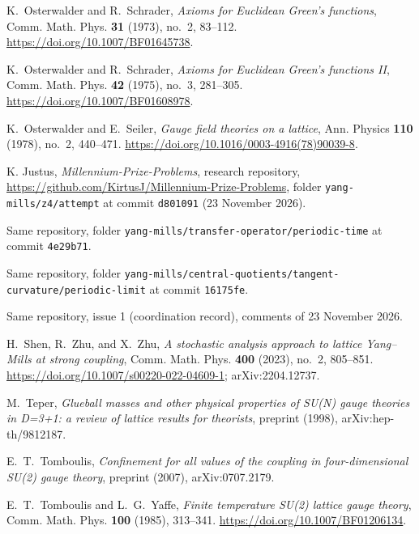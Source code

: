 K.~Osterwalder and R.~Schrader, \emph{Axioms for Euclidean Green's functions},
Comm. Math. Phys. \textbf{31} (1973), no.~2, 83--112.
\url{https://doi.org/10.1007/BF01645738}.

K.~Osterwalder and R.~Schrader, \emph{Axioms for Euclidean Green's functions II},
Comm. Math. Phys. \textbf{42} (1975), no.~3, 281--305.
\url{https://doi.org/10.1007/BF01608978}.

K.~Osterwalder and E.~Seiler, \emph{Gauge field theories on a lattice},
Ann. Physics \textbf{110} (1978), no.~2, 440--471.
\url{https://doi.org/10.1016/0003-4916(78)90039-8}.

 K. Justus, \emph{Millennium-Prize-Problems}, research repository, \url{https://github.com/KirtusJ/Millennium-Prize-Problems}, folder \texttt{yang-mills/z4/attempt} at commit \texttt{d801091} (23 November 2026).

 Same repository, folder \texttt{yang-mills/transfer-operator/periodic-time} at commit \texttt{4e29b71}.

 Same repository, folder \texttt{yang-mills/central-quotients/tangent-curvature/periodic-limit} at commit \texttt{16175fe}.

 Same repository, issue 1 (coordination record), comments of 23 November 2026.

H.~Shen, R.~Zhu, and X.~Zhu, \emph{A stochastic analysis approach to lattice Yang--Mills at strong coupling},
Comm. Math. Phys. \textbf{400} (2023), no.~2, 805--851.
\url{https://doi.org/10.1007/s00220-022-04609-1}; arXiv:2204.12737.

M.~Teper, \emph{Glueball masses and other physical properties of SU(N) gauge theories in D=3+1: a review of lattice results for theorists},
preprint (1998), arXiv:hep-th/9812187.

E.~T.~Tomboulis, \emph{Confinement for all values of the coupling in four-dimensional SU(2) gauge theory},
preprint (2007), arXiv:0707.2179.

E.~T.~Tomboulis and L.~G.~Yaffe, \emph{Finite temperature SU(2) lattice gauge theory},
Comm. Math. Phys. \textbf{100} (1985), 313--341.
\url{https://doi.org/10.1007/BF01206134}.
